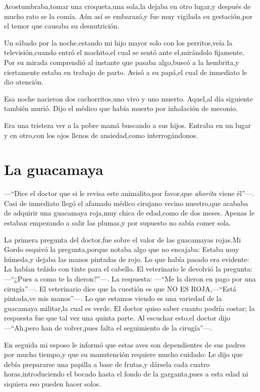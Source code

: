 \documentclass[letterpaper,12pt]{book}
\begin{document}
Acostumbraba,tomar una croqueta,una sola,la dejaba en otro lugar,y después de mucho rato se la comía. Aún así se embarazó,y fue muy vigilada su gestación,por el temor que causaba su desnutrición.

Un sábado por la noche,estando mi hijo mayor solo con los perritos,veía la televisión,cuando entró el machito,el cual se sentó ante el,mirándolo fijamente. Por su mirada comprendió al instante que pasaba algo,buscó a la hembrita,y ciertamente estaba en trabajo de parto. Avisó a su papá,el cual de inmediato le dio atención. 

Esa noche nacieron dos cachorritos,uno vivo y uno muerto. Aquel,al día siguiente también murió. Dijo el médico que había muerto por inhalación de meconio. 

Era una tristeza ver a la pobre mamá buscando a sus hijos. Entraba en un lugar y en otro,con los ojos llenos de ansiedad,como interrogándonos.

\chapter{La guacamaya}

---``Dice el doctor que si le revisa este animalito,por favor,que \textit{ahorita} viene él''---. Casi de inmediato llegó el afamado médico cirujano vecino nuestro,que acababa de adquirir una guacamaya roja,muy chica de edad,como de dos meses. Apenas le estaban empezando a salir las plumas,y por supuesto no sabía comer sola. 

La primera pregunta del doctor,fue sobre el valor de las guacamayas rojas.Mi Gordo esquivó la pregunta,porque notaba algo que no encajaba: Estaba muy húmeda,y dejaba las manos pintadas de rojo. Lo que había pasado era evidente: La habían teñido con tinte para el cabello. El veterinario le devolvió la pregunta: ---``¿Pues a como te la dieron?''---. La respuesta: ---``Me la dieron en pago por una cirugía''---. El veterinario dice que la cuestión es que NO ES ROJA,---``Está pintada,ve mis manos''---. Lo que estamos viendo es una variedad de la guacamaya militar,la cual es verde. El doctor quiso saber cuanto podría costar; la respuesta fue que tal vez una quinta parte. Al escuchar esto,el doctor dijo ---``Ah,pero han de volver,pues falta el seguimiento de la cirugía''---.

En seguida mi esposo le informó que estas aves son dependientes de sus padres por mucho tiempo,y que su manutención requiere mucho cuidado: Le dijo que debía prepararse una papilla a base de frutas,y dársela cada cuatro horas,introduciendo el bocado hasta el fondo de la garganta,pues a esta edad ni siquiera eso pueden hacer solos.
\end{document}
